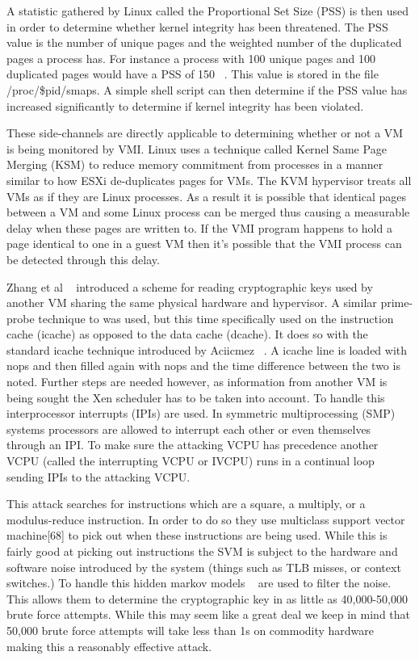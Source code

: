 A statistic gathered by Linux called the Proportional Set Size (PSS) is then used in order to determine whether kernel integrity has been threatened. The PSS value is the number of unique pages and the weighted number of the duplicated pages a process has. For instance a process with 100 unique pages and 100 duplicated pages would have a PSS of 150 ~\cite{xiao_security_2013}. This value is stored in the file /proc/\$pid/smaps. A simple shell script can then determine if the PSS value has increased significantly to determine if kernel integrity has been violated. 

These side-channels are directly applicable to determining whether or not a VM is being monitored by VMI. Linux uses a technique called Kernel Same Page Merging (KSM) to reduce memory commitment from processes in a manner similar to how ESXi de-duplicates pages for VMs. The KVM hypervisor treats all VMs as if they are Linux processes. As a result it is possible that identical pages between a VM and some Linux process can be merged thus causing a measurable delay when these pages are written to. If the VMI program happens to hold a page identical to one in a guest VM then it's possible that the VMI process can be detected through this delay. 

Zhang et al ~\cite{zhang_cross-vm_2012} introduced a scheme for reading cryptographic keys used by another VM sharing the same physical hardware and hypervisor. A similar prime-probe technique to was used, but this time specifically used on the instruction cache (icache) as opposed to the data cache (dcache). It does so with the standard icache technique introduced by Aciicmez ~\cite{aciiamez_yet_2007}. A icache line is loaded with nops and then filled again with nops and the time difference between the two is noted. Further steps are needed however, as information from another VM is being sought the Xen scheduler has to be taken into account. To handle this interprocessor interrupts (IPIs) are used. In symmetric multiprocessing (SMP) systems processors are allowed to interrupt each other or even themselves through an IPI. To make sure the attacking VCPU has precedence another VCPU (called the interrupting VCPU or IVCPU) runs in a continual loop sending IPIs to the attacking VCPU.

This attack searches for instructions which are a square, a multiply, or a modulus-reduce instruction. In order to do so they use multiclass support vector machine[68] to pick out when these instructions are being used. While this is fairly good at picking out instructions the SVM is subject to the hardware and software noise introduced by the system (things such as TLB misses, or context switches.) To handle this hidden markov models ~\cite{bishop_pattern_2006} are used to filter the noise. This allows them to determine the cryptographic key in as little as 40,000-50,000 brute force attempts. While this may seem like a great deal we keep in mind that 50,000 brute force attempts will take less than 1s on commodity hardware making this a reasonably effective attack. 

